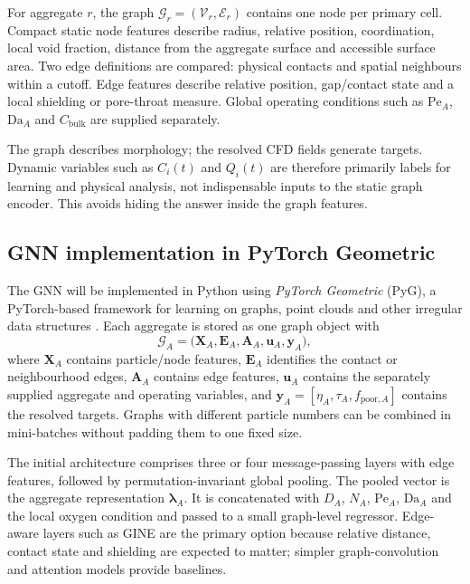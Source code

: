 \documentclass[11pt,a4paper]{article}
\newcommand{\Pe}{\mathrm{Pe}}
\newcommand{\Da}{\mathrm{Da}}
\begin{document}
For aggregate \(r\), the graph
\(\mathcal{G}_r=(\mathcal{V}_r,\mathcal{E}_r)\) contains one node per primary
cell. Compact static node features describe radius, relative position,
coordination, local void fraction, distance from the aggregate surface and
accessible surface area. Two edge definitions are compared: physical contacts
and spatial neighbours within a cutoff. Edge features describe relative
position, gap/contact state and a local shielding or pore-throat measure.
Global operating conditions such as \(\Pe_A\), \(\Da_A\) and
\(C_{\mathrm{bulk}}\) are supplied separately.

The graph describes morphology; the resolved CFD fields generate targets.
Dynamic variables such as \(C_i(t)\) and \(Q_i(t)\) are therefore primarily
labels for learning and physical analysis, not indispensable inputs to the
static graph encoder. This avoids hiding the answer inside the graph features.

\subsection{GNN implementation in PyTorch Geometric}

The GNN will be implemented in Python using \emph{PyTorch Geometric} (PyG), a
PyTorch-based framework for learning on graphs, point clouds and other
irregular data structures \cite{FeyLenssen2019}. Each aggregate is stored as
one graph object with
\begin{equation}
  \mathcal{G}_A=
  \bigl(\boldsymbol{X}_A,\boldsymbol{E}_A,
  \boldsymbol{A}_A,\boldsymbol{u}_A,\boldsymbol{y}_A\bigr),
  \label{eq:pyg_data}
\end{equation}
where \(\boldsymbol{X}_A\) contains particle/node features,
\(\boldsymbol{E}_A\) identifies the contact or neighbourhood edges,
\(\boldsymbol{A}_A\) contains edge features, \(\boldsymbol{u}_A\) contains
the separately supplied aggregate and operating variables, and
\(\boldsymbol{y}_A=[\eta_A,\tau_A,f_{\mathrm{poor},A}]\) contains the resolved
targets. Graphs with different particle numbers can be combined in mini-batches
without padding them to one fixed size.

The initial architecture comprises three or four message-passing layers with
edge features, followed by permutation-invariant global pooling. The pooled
vector is the aggregate representation \(\boldsymbol{\lambda}_A\). It is
concatenated with \(D_A\), \(N_A\), \(\Pe_A\), \(\Da_A\) and the local oxygen
condition and passed to a small graph-level regressor. Edge-aware layers such
as GINE are the primary option because relative distance, contact state and
shielding are expected to matter; simpler graph-convolution and attention
models provide baselines.
\end{document}
